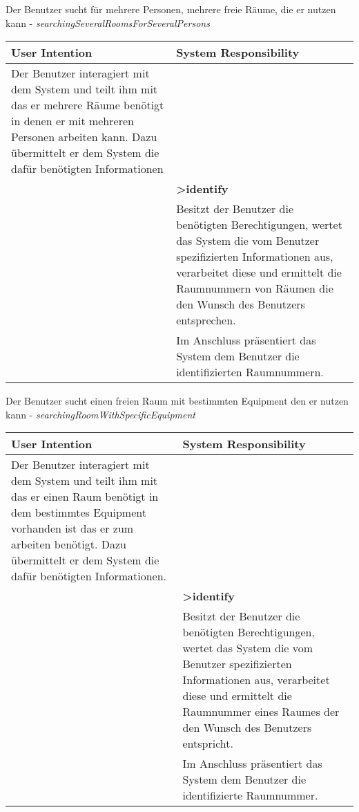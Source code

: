 \begin{table}[h]
	Der Benutzer sucht für mehrere Personen, mehrere freie Räume, die er nutzen kann - \textit{searchingSeveralRoomsForSeveralPersons}\\
	\begin{tabularx}{\textwidth}{|X|X|}
	\rowcolor{heading} \textbf{User Intention} & \textbf{System Responsibility}\\ \hline
	Der Benutzer interagiert mit dem System und teilt ihm mit das er mehrere Räume benötigt in denen er mit mehreren Personen arbeiten kann. Dazu übermittelt er dem System die dafür benötigten Informationen & \\  \hline
	 & \textbf{>identify} \\ \hline
	 & Besitzt der Benutzer die benötigten Berechtigungen, wertet das System die vom Benutzer spezifizierten Informationen aus, verarbeitet diese und ermittelt die Raumnummern von Räumen die den Wunsch des Benutzers entsprechen.\\ \hline
	 & Im Anschluss präsentiert das System dem Benutzer die identifizierten Raumnummern.\\ \hline
	\end{tabularx}
	
	Der Benutzer sucht einen freien Raum mit bestimmten Equipment den er nutzen kann - \textit{searchingRoomWithSpecificEquipment}\\
	\begin{tabularx}{\textwidth}{|X|X|}
	\rowcolor{heading} \textbf{User Intention} & \textbf{System Responsibility}\\ \hline
	Der Benutzer interagiert mit dem System und teilt ihm mit das er einen Raum benötigt in dem bestimmtes Equipment vorhanden ist das er zum arbeiten benötigt. Dazu übermittelt er dem System die dafür benötigten Informationen. & \\  \hline
	 & \textbf{>identify} \\ \hline
	 & Besitzt der Benutzer die benötigten Berechtigungen, wertet das System die vom Benutzer spezifizierten Informationen aus, verarbeitet diese und ermittelt die Raumnummer eines Raumes der den Wunsch des Benutzers entspricht.\\ \hline
	 & Im Anschluss präsentiert das System dem Benutzer die identifizierte Raumnummer.\\ \hline
	\end{tabularx}
	

\end{table}
